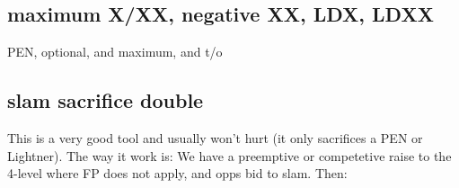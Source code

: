 \subsection{maximum X/XX, negative XX, LDX, LDXX} 

PEN, optional, and maximum, and t/o

\subsection{slam sacrifice double}

This is a very good tool and usually won't hurt (it only sacrifices a PEN or Lightner). The way it work is:
We have a preemptive or competetive raise to the 4-level where FP does not apply, and opps bid to slam. Then:




